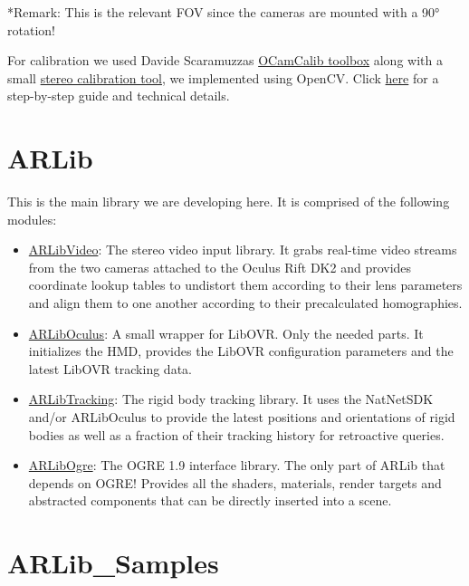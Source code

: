 \documentclass[]{article}
\begin{document}
*Remark: This is the relevant FOV since the cameras are mounted with a
90° rotation!

For calibration we used Davide Scaramuzzas
\href{https://sites.google.com/site/scarabotix/ocamcalib-toolbox}{OCamCalib
toolbox} along with a small
\href{https://github.com/ands/OculusMeetsAR/tree/master/Hardware}{stereo
calibration tool}, we implemented using OpenCV. Click
\href{https://github.com/ands/OculusMeetsAR/wiki/Calibration}{here} for
a step-by-step guide and technical details.

\section{ARLib}\label{arlib}

This is the main library we are developing here. It is comprised of the
following modules:

\begin{itemize}
\item
  \href{https://github.com/ands/OculusMeetsAR/wiki/Video-Module}{ARLibVideo}:
  The stereo video input library. It grabs real-time video streams from
  the two cameras attached to the Oculus Rift DK2 and provides
  coordinate lookup tables to undistort them according to their lens
  parameters and align them to one another according to their
  precalculated homographies.
\item
  \href{https://github.com/ands/OculusMeetsAR/wiki/Oculus-Module}{ARLibOculus}:
  A small wrapper for LibOVR. Only the needed parts. It initializes the
  HMD, provides the LibOVR configuration parameters and the latest
  LibOVR tracking data.
\item
  \href{https://github.com/ands/OculusMeetsAR/wiki/Tracking-Module}{ARLibTracking}:
  The rigid body tracking library. It uses the NatNetSDK and/or
  ARLibOculus to provide the latest positions and orientations of rigid
  bodies as well as a fraction of their tracking history for retroactive
  queries.
\item
  \href{https://github.com/ands/OculusMeetsAR/wiki/Ogre-Module}{ARLibOgre}:
  The OGRE 1.9 interface library. The only part of ARLib that depends on
  OGRE! Provides all the shaders, materials, render targets and
  abstracted components that can be directly inserted into a scene.
\end{itemize}

\section{ARLib\_Samples}\label{arlibux5fsamples}
\end{document}
